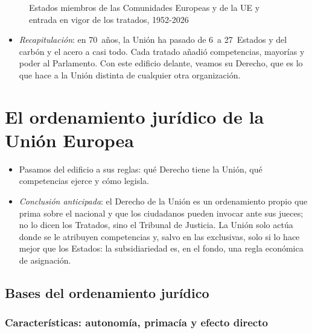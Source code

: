 \documentclass[11pt]{article}
\begin{document}
\begin{figure}[H]
\centering
\caption{Estados miembros de las Comunidades Europeas y de la UE y entrada en vigor de los tratados, 1952-2026}\label{fig:ampliaciones}
\end{figure}

\begin{itemize}
\item \emph{Recapitulación}: en 70~años, la Unión ha pasado de 6~a 27~Estados y del carbón y el acero a casi todo. Cada tratado añadió competencias, mayorías y poder al Parlamento. Con este edificio delante, veamos su Derecho, que es lo que hace a la Unión distinta de cualquier otra organización.
\end{itemize}

\section{El ordenamiento jurídico\cortetitulo{} de la Unión Europea}\label{sec:ordenamiento}

\begin{itemize}
\item Pasamos del edificio a sus reglas: qué Derecho tiene la Unión, qué competencias ejerce y cómo legisla.
\item \emph{Conclusión anticipada}: el Derecho de la Unión es un ordenamiento propio que prima sobre el nacional y que los ciudadanos pueden invocar ante sus jueces; no lo dicen los Tratados, sino el Tribunal de Justicia. La Unión solo actúa donde se le atribuyen competencias y, salvo en las exclusivas, solo si lo hace mejor que los Estados: la subsidiariedad es, en el fondo, una regla económica de asignación.
\end{itemize}

\subsection{Bases del ordenamiento jurídico}\label{sec:bases}

\subsubsection{Características: autonomía, primacía y efecto directo}\label{sec:caracteristicas}
\end{document}

